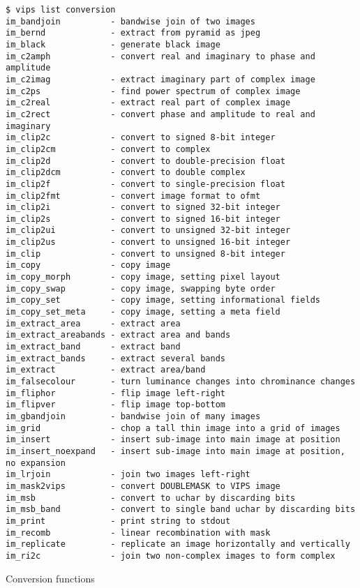 \begin{fig2}
\begin{verbatim}
$ vips list conversion
im_bandjoin          - bandwise join of two images
im_bernd             - extract from pyramid as jpeg
im_black             - generate black image
im_c2amph            - convert real and imaginary to phase and amplitude
im_c2imag            - extract imaginary part of complex image
im_c2ps              - find power spectrum of complex image
im_c2real            - extract real part of complex image
im_c2rect            - convert phase and amplitude to real and imaginary
im_clip2c            - convert to signed 8-bit integer
im_clip2cm           - convert to complex
im_clip2d            - convert to double-precision float
im_clip2dcm          - convert to double complex
im_clip2f            - convert to single-precision float
im_clip2fmt          - convert image format to ofmt
im_clip2i            - convert to signed 32-bit integer
im_clip2s            - convert to signed 16-bit integer
im_clip2ui           - convert to unsigned 32-bit integer
im_clip2us           - convert to unsigned 16-bit integer
im_clip              - convert to unsigned 8-bit integer
im_copy              - copy image
im_copy_morph        - copy image, setting pixel layout
im_copy_swap         - copy image, swapping byte order
im_copy_set          - copy image, setting informational fields
im_copy_set_meta     - copy image, setting a meta field
im_extract_area      - extract area
im_extract_areabands - extract area and bands
im_extract_band      - extract band
im_extract_bands     - extract several bands
im_extract           - extract area/band
im_falsecolour       - turn luminance changes into chrominance changes
im_fliphor           - flip image left-right
im_flipver           - flip image top-bottom
im_gbandjoin         - bandwise join of many images
im_grid              - chop a tall thin image into a grid of images
im_insert            - insert sub-image into main image at position
im_insert_noexpand   - insert sub-image into main image at position, no expansion
im_lrjoin            - join two images left-right
im_mask2vips         - convert DOUBLEMASK to VIPS image
im_msb               - convert to uchar by discarding bits
im_msb_band          - convert to single band uchar by discarding bits
im_print             - print string to stdout
im_recomb            - linear recombination with mask
im_replicate         - replicate an image horizontally and vertically
im_ri2c              - join two non-complex images to form complex
\end{verbatim}
\caption{Conversion functions}
\label{fg:conversion}
\end{fig2}

